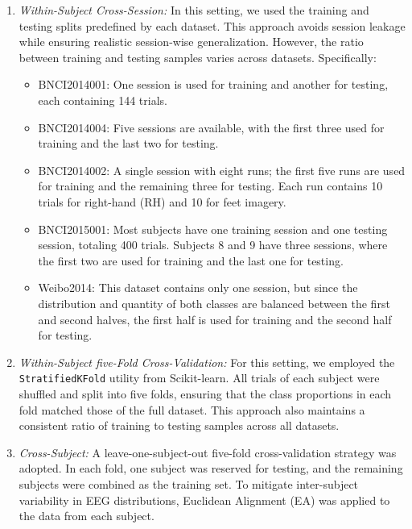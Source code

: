 \documentclass[journal,twocolumn]{IEEEtran}
\begin{document}
\begin{enumerate}
  \item \emph{Within-Subject Cross-Session:}
  In this setting, we used the training and testing splits predefined by each dataset. This approach avoids session leakage while ensuring realistic session-wise generalization. However, the ratio between training and testing samples varies across datasets. Specifically:
  \begin{itemize}
    \item BNCI2014001: One session is used for training and another for testing, each containing 144 trials.
    \item BNCI2014004: Five sessions are available, with the first three used for training and the last two for testing.
    \item BNCI2014002: A single session with eight runs; the first five runs are used for training and the remaining three for testing. Each run contains 10 trials for right-hand (RH) and 10 for feet imagery.
    \item BNCI2015001: Most subjects have one training session and one testing session, totaling 400 trials. Subjects 8 and 9 have three sessions, where the first two are used for training and the last one for testing.
    \item Weibo2014: This dataset contains only one session, but since the distribution and quantity of both classes are balanced between the first and second halves, the first half is used for training and the second half for testing.
  \end{itemize}

  \item \emph{Within-Subject five-Fold Cross-Validation:}
  For this setting, we employed the \texttt{StratifiedKFold} utility from Scikit-learn. All trials of each subject were shuffled and split into five folds, ensuring that the class proportions in each fold matched those of the full dataset. This approach also maintains a consistent ratio of training to testing samples across all datasets.

  \item \emph{Cross-Subject:}
  A leave-one-subject-out five-fold cross-validation strategy was adopted. In each fold, one subject was reserved for testing, and the remaining subjects were combined as the training set. To mitigate inter-subject variability in EEG distributions, Euclidean Alignment (EA) \cite{he2019transfer} was applied to the data from each subject.
\end{enumerate}
\end{document}
